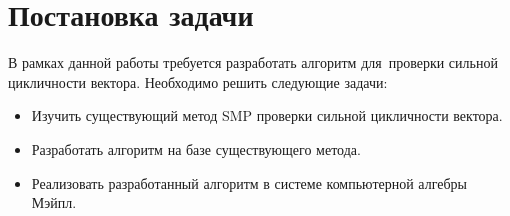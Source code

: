 \section{Постановка задачи}

В рамках данной работы требуется разработать алгоритм для~проверки сильной цикличности вектора.
Необходимо решить следующие задачи:
\begin{itemize}
    \item Изучить существующий метод SMP проверки сильной цикличности вектора.
    \item Разработать алгоритм на базе существующего метода.
    \item Реализовать разработанный алгоритм в системе компьютерной алгебры Мэйпл.
\end{itemize}
